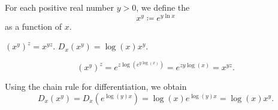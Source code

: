 \begin{Definition}\label{def:power_function}
  For each positive real number \( y > 0 \), we define the 
  \begin{equation*}
    x^y \coloneqq e^{y \ln x}
  \end{equation*}
  as a function of \( x \).
\end{Definition}

\begin{Proposition}\label{thm:power_function_properties}
  \mbox{}
  \begin{PropEnum}
     \( (x^y)^z = x^{yz} \).
     \( D_x(x^y) = \log(x) x^y \).
  \end{PropEnum}
\end{Proposition}
\begin{RefListProof}
    \begin{equation*}
      (x^y)^z
      =
      e^{z \log(e^{y \log(x)})}
      =
      e^{z y \log(x)}
      =
      x^{yz}.
    \end{equation*}

     Using the chain rule for differentiation, we obtain
    \begin{equation*}
      D_x(x^y) = D_x(e^{\log(y) x}) = \log(x) e^{\log(y) x} = \log(x) x^y.
    \end{equation*}
\end{RefListProof}
